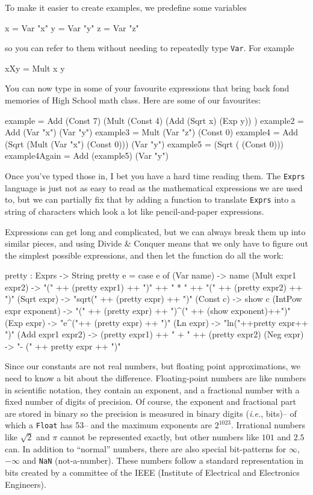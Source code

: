\documentclass[12pt]{amsbook}
\begin{document}
To make it easier to create examples, we predefine some variables 
\begin{code}
x = Var "x"
y = Var "y"
z = Var "z"
\end{code}
so you can refer to them without needing to repeatedly type \verb|Var|.
For example
\begin{code}
xXy =  Mult x y
\end{code}
You can now type in some of your favourite expressions
that bring back fond memories of High School math class.
Here are some of our favourites:
\vspace{-12pt}
\begin{code}
example = Add (Const 7) (Mult (Const 4) (Add (Sqrt x) (Exp y)) )
example2 = Add (Var "x") (Var "y")
example3 = Mult (Var "z") (Const 0)
example4 = Add (Sqrt (Mult (Var "x") (Const 0))) (Var "y")
example5 = (Sqrt ( (Const 0)))
example4Again = Add (example5) (Var "y")
\end{code}

\medskip
Once you've typed those in, I bet you have a hard time reading them.
The \verb|Exprs| language is just not as easy to read as the mathematical expressions we are used to,
but we can partially fix that by adding a function to 
translate \verb|Exprs| into a string of characters  which
look a lot like pencil-and-paper expressions.

Expressions can get long and complicated,
but we can always break them up into similar pieces,
and using Divide \& Conquer means that we only have to 
figure out the simplest possible expressions, and then
let the function do all the work:
\begin{code}
pretty : Exprs -> String
pretty e = case e of
            (Var name) -> name
            (Mult expr1 expr2) -> "(" ++ (pretty expr1) ++ ")" ++ " * " ++ "(" ++ (pretty expr2) ++ ")"
            (Sqrt expr) -> "sqrt(" ++ (pretty expr) ++ ")"
            (Const c) -> show c
            (IntPow expr exponent) -> "(" ++ (pretty expr) ++ ")^(" ++ (show exponent)++")"
            (Exp expr) -> "e^("++ (pretty expr) ++ ")"
            (Ln expr) -> "ln("++pretty expr++ ")"
            (Add expr1 expr2) -> (pretty expr1) ++ " + " ++ (pretty expr2)
            (Neg expr) -> "- (" ++ pretty expr ++ ")"
\end{code}

Since our constants are not real numbers, 
but floating point approximations,
we need to know a bit about the difference.
Floating-point numbers are like numbers in scientific notation,
they contain an exponent, and a fractional number with a fixed 
number of digits of precision.  
Of course, the exponent and fractional part are stored in binary
so the precision is measured in binary digits (\emph{i.e.}, bits)--%
of which a \verb|Float| has 53--%
and the maximum exponents are $2^{1023}$.
Irrational numbers like $\sqrt{2}$ and $\pi$ cannot be represented
exactly, but other numbers like $101$ and $2.5$ can.
In addition to ``normal'' numbers,
there are also special bit-patterns for $\infty$, $-\infty$
and \verb|NaN| (not-a-number).
These numbers follow a standard representation in bits created by
a committee of the IEEE (Institute of Electrical and Electronics Engineers).
\end{document}
